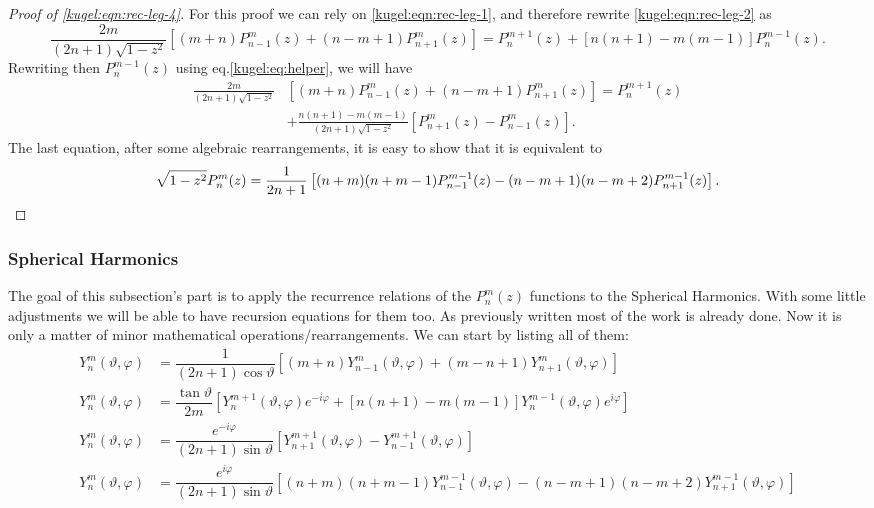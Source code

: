 \begin{proof}[Proof of \eqref{kugel:eqn:rec-leg-4}]
  For this proof we can rely on \eqref{kugel:eqn:rec-leg-1}, and therefore
  rewrite \eqref{kugel:eqn:rec-leg-2} as 
  \begin{equation*}
    \frac{2m}{(2n+1)\sqrt{1-z^2}} \left[
      (m+n)P^m_{n-1}(z) + (n-m+1)P^m_{n+1}(z)
    \right] = P^{m+1}_n(z) + [ n(n+1)-m(m-1) ]P^{m-1}_n(z).
  \end{equation*}
  Rewriting then $P^{m-1}_n(z)$ using eq.\eqref{kugel:eq:helper}, we will have
  \begin{align*}
    \frac{2m}{(2n+1)\sqrt{1-z^2}}
      &\left[ (m+n)P^m_{n-1}(z) + (n-m+1)P^m_{n+1}(z) \right] = P^{m+1}_n(z) \\
      &+ \frac{n(n+1)-m(m-1)}{(2n+1)\sqrt{1-z^2}} \left[
          P^m_{n+1}(z)-P^m_{n-1}(z)
        \right].
  \end{align*}
  The last equation, after some algebraic rearrangements, it is easy to show
  that it is equivalent to
  \begin{equation*}
    \sqrt{1-z^2} P^m_n(z) = \dfrac{1}{2n+1} \left[
      (n+m)(n+m-1)P^{m-1}_{n-1}(z) - (n-m+1)(n-m+2)P^{m-1}_{n+1}(z)
    \right].
    \qedhere
  \end{equation*}
\end{proof}

\subsubsection{Spherical Harmonics}

The goal of this subsection's part is to apply the recurrence relations of the
$P^m_n(z)$ functions to the Spherical Harmonics.  With some little adjustments
we will be able to have recursion equations for them too. As previously written
most of the work is already done. Now it is only a matter of minor mathematical
operations/rearrangements. We can start by listing all of them:
\begin{subequations}
  \begin{align}
  Y^m_n(\vartheta, \varphi) &= \dfrac{1}{(2n+1)\cos \vartheta} \left[
      (m+n)Y^m_{n-1}(\vartheta, \varphi)
      + (m-n+1)Y^m_{n+1}(\vartheta, \varphi)
    \right] \label{kugel:eqn:rec-sph-harm-1} \\
  Y^m_n(\vartheta, \varphi) &= \dfrac{\tan \vartheta}{2m}\left[
      Y^{m+1}_n(\vartheta, \varphi)e^{-i\varphi}
      + [n(n+1)-m(m-1)]Y^{m-1}_n(\vartheta, \varphi)e^{i\varphi}
    \right] \label{kugel:eqn:rec-sph-harm-2} \\
  Y^m_n(\vartheta, \varphi) &= \dfrac{e^{-i\varphi}}{ (2n+1)\sin \vartheta}
    \left[
      Y^{m+1}_{n+1}(\vartheta, \varphi)
      - Y^{m+1}_{n-1}(\vartheta, \varphi)
    \right] \label{kugel:eqn:rec-sph-harm-3} \\
  Y^m_n(\vartheta, \varphi) &= \dfrac{e^{i\varphi}}{(2n+1)\sin \vartheta}
    \left[
      (n+m)(n+m-1)Y^{m-1}_{n-1}(\vartheta, \varphi)
      - (n-m+1)(n-m+2)Y^{m-1}_{n+1}(\vartheta, \varphi)
    \right] \label{kugel:eqn:rec-sph-harm-4} 
  \end{align}
\end{subequations}

